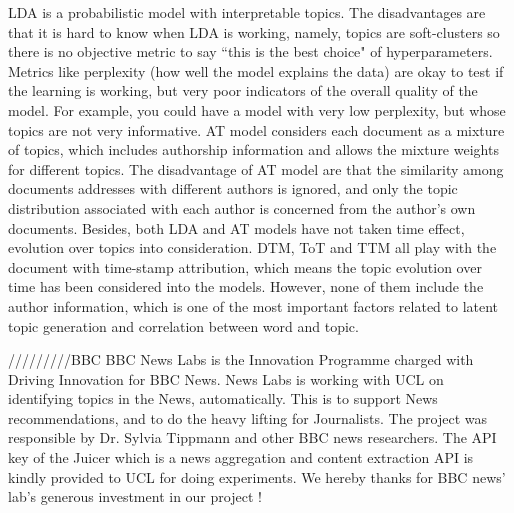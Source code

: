 LDA is a probabilistic model with interpretable topics. The disadvantages are that it is hard to know when LDA is working, namely, topics are soft-clusters so there is no objective metric to say ``this is the best choice" of hyperparameters. Metrics like perplexity (how well the model explains the data) are okay to test if the learning is working, but very poor indicators of the overall quality of the model. For example, you could have a model with very low perplexity, but whose topics are not very informative. AT model considers each document as a mixture of topics, which includes authorship  information  and  allows  the  mixture  weights  for  different  topics. The disadvantage of AT model are that the similarity among documents addresses with different authors is ignored, and only the topic distribution associated with each author is concerned from the author’s own documents. Besides, both LDA and AT models have not taken time effect, evolution over topics into consideration. DTM, ToT and TTM all play with the document with time-stamp attribution, which means the topic evolution over time has been considered into the models. However, none of them include the author information, which is one of the most important factors related to latent topic generation and correlation between word and topic.



/////////BBC 
BBC News Labs is the Innovation Programme charged with Driving Innovation for BBC News. News Labs is working with UCL on identifying topics in the News, automatically. This is to support News recommendations, and to do the heavy lifting for Journalists. The project was responsible by Dr. Sylvia Tippmann and other BBC news researchers. The API key of the Juicer which is a news aggregation and content extraction API is kindly provided to UCL for doing experiments. We hereby thanks for BBC news' lab's generous investment in our project !

